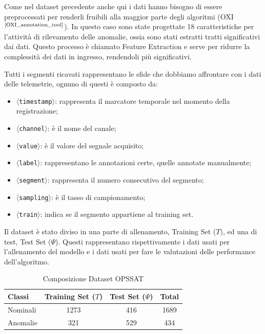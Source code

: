 Come nel dataset precedente anche qui i dati hanno bisogno di essere preprocessati per renderli fruibili alla maggior parte degli algoritmi (OXI$^{\text{\cite{OXI_annotation_tool}}}$). In questo caso sono state progettate 18 caratteristiche per l'attività di rilevamento delle anomalie, ossia sono stati estratti tratti significativi dai dati. Questo processo è chiamato Feature Extraction e serve per ridurre la complessità dei dati in ingresso, rendendoli più significativi.

Tutti i segmenti ricavati rappresentano le sfide che dobbiamo affrontare con i dati delle telemetrie, ognuno di questi è composto da:
\begin{itemize}
    \item $\langle$\texttt{timestamp}$\rangle$: rappresenta il marcatore temporale nel momento della registrazione;
    \item $\langle$\texttt{channel}$\rangle$: è il nome del canale;
    \item $\langle$\texttt{value}$\rangle$: è il valore del segnale acquisito;
    \item $\langle$\texttt{label}$\rangle$: rappresentano le annotazioni certe, quelle annotate manualmente;
    \item $\langle$\texttt{segment}$\rangle$: rappresenta il numero consecutivo del segmento;
    \item $\langle$\texttt{sampling}$\rangle$: è il tasso di campionamento;
    \item $\langle$\texttt{train}$\rangle$: indica se il segmento appartiene al training set.
    
\end{itemize}

Il dataset è stato diviso in una parte di allenamento, Training Set ($T$), ed una di test, Test Set ($\Psi$). Questi rappresentano rispettivamente i dati usati per l'allenamento del modello e i dati usati per fare le valutazioni delle performance dell'algoritmo.

\begin{table}[h!]
    \centering
    \begin{tabular}{|l|c|c|c|}
        \hline
        \textbf{Classi} &\textbf{Training Set} ($T$) & \textbf{Test Set ($\Psi$)}&\textbf{Total} \\
        \hline
         Nominali& 1273&416 &1689 \\
         Anomalie& 321&529 &434\\
         \hline
    \end{tabular}
    \caption{Composizione Dataset OPS\textunderscore SAT}
    \label{tab:dataset_op-sat}
\end{table}

